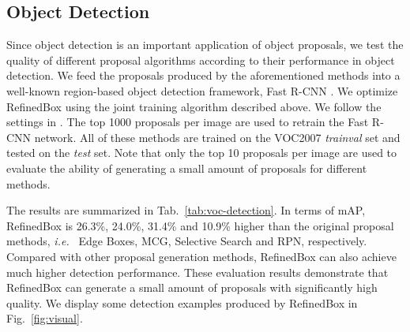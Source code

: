 \documentclass[10pt,twocolumn,letterpaper]{article}
\newcommand{\figref}[1]{Fig.~\ref{#1}}
\newcommand{\tabref}[1]{Tab.~\ref{#1}}
\def\ie{\emph{i.e.~}}
\begin{document}
\subsection{Object Detection}
%
%
Since object detection is an important application of object
proposals, we test the quality of different proposal algorithms
according to their performance in object detection.
%
We feed the proposals produced by the aforementioned
methods into a well-known region-based object detection framework,
Fast R-CNN \cite{girshick2015fast}.
We optimize RefinedBox using the joint training algorithm described above.
We follow the settings in \cite{zhang2017sequential}.
The top 1000 proposals per image are used to retrain the Fast R-CNN
network.
All of these methods are trained on the VOC2007 \textit{trainval} set
and tested on the \textit{test} set.
Note that only the top 10 proposals per image are used to evaluate 
the ability of generating a small amount of proposals for different
methods.


The results are summarized in \tabref{tab:voc-detection}.
In terms of mAP, RefinedBox is 26.3\%, 24.0\%, 31.4\% and 
10.9\% higher than the original proposal methods, \ie
Edge Boxes, MCG, Selective Search and RPN, respectively.
Compared with other proposal generation methods, RefinedBox can also
achieve much higher detection performance.
These evaluation results demonstrate that RefinedBox can generate
a small amount of proposals with significantly high quality.
We display some detection examples produced by RefinedBox in \figref{fig:visual}.



\end{document}
